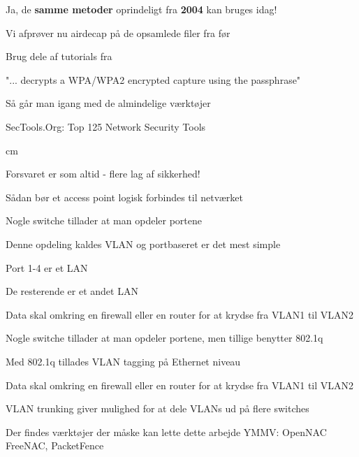 \documentclass[Screen16to9,17pt]{foils}
\begin{document}
\centerline{Ja, de {\bf samme metoder} oprindeligt fra {\bf 2004} kan bruges idag!}



\begin{list1}
\item Vi afprøver nu airdecap på de opsamlede filer fra før
\item Brug dele af tutorials fra\\
\item "... decrypts a WPA/WPA2 encrypted capture using the passphrase"
\end{list1}




\begin{list1}
\item Så går man igang med de almindelige værktøjer
\item SecTools.Org: Top 125 Network Security Tools 
\end{list1}
 cm

\centerline{\hlkbig Forsvaret er som altid - flere lag af sikkerhed! }



\centerline{\hlkbig Sådan bør et access point logisk forbindes til netværket}




\begin{list2}
\item Nogle switche tillader at man opdeler portene
\item Denne opdeling kaldes VLAN og portbaseret er det mest simple
\item Port 1-4 er et LAN
\item De resterende er et andet LAN
\item Data skal omkring en firewall eller en router for at krydse fra VLAN1 til VLAN2
\end{list2}



\begin{list2}
\item Nogle switche tillader at man opdeler portene, men tillige benytter 802.1q
\item Med 802.1q tillades VLAN tagging på Ethernet niveau
\item Data skal omkring en firewall eller en router for at krydse fra VLAN1 til VLAN2
\item VLAN trunking giver mulighed for at dele VLANs ud på flere switches
\item Der findes værktøjer der måske kan lette dette arbejde YMMV: OpenNAC FreeNAC, PacketFence
\end{list2}
\end{document}
